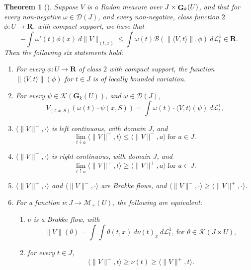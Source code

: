 \documentclass{article}
\theoremstyle{plain}
\newtheorem{theorem}{Theorem}[section]
\theoremstyle{definition}
\theoremstyle{plain}
\theoremstyle{remark}
\theoremstyle{remark}
\theoremstyle{plain}
\DeclareMathOperator{\G}{{\bf G}}
\begin{document}
\begin{theorem}[]\label{thm:Space time Brakke flow}
    Suppose $V$ is a Radon measure over $J\times \G_k(U)$, and that for every non-negative $\omega \in \mathscr D(J)$, and every non-negative, class function $2$ $\phi :  U \to \mathbf R$, with compact support, we have that
    \begin{equation}\label{eq:Brakke's distributional inequality}
        - \textstyle \int \omega'(t) \phi(x) \ d \|V\|_{(t,x)} 
        \leq \textstyle \int \omega(t) \mathscr B(\|\langle V,t\rangle \|,\phi) \ d \mathscr L^1_t \in \mathbf R. 
    \end{equation}
    Then the following six statements hold:
    \begin{enumerate}[label=\ref{thm:Space time Brakke flow}.\arabic{enumi}]
        \item \label{Space time Brakke flow:0}
        For every $\phi : U \to \mathbf R$ of class $2$ with compact support, 
        the function $\|\langle V,t\rangle \|(\phi)$ for $t\in J$ is of locally bounded variation.
        \item For every $\psi \in \mathscr{K} (\mathbf{G}_{k} (U))$, and $\omega \in \mathscr D(J)$, 
        \[ V_{(t,x, S)}(\omega(t)\cdot \psi(x, S)) = \textstyle \int \omega(t)\cdot \langle V,t\rangle (\psi) \ d \mathscr L^1_t,\]
        
        \item \label{Space time Brakke flow:1} $\langle \|V\|^-,\cdot \rangle$ is left continuous, with domain $J$, and 
        \[  \lim\limits_{t \downarrow a} \langle \|V\|^{-},t\rangle  \leq \langle \| V\|^{-},a\rangle \ \text{for $a\in J$}.\]
        \item \label{Space time Brakke flow:2}
        $\langle \| V \|^{+},\cdot \rangle$ is right continuous, with domain $J$, and 
        \[  \lim\limits_{t \uparrow a} \langle \|V\|^{+},t\rangle  \geq \langle \| V\|^{+},a\rangle  \ \text{for $a\in J$}.\]
        \item \label{Space time Brakke flow:3}
        $\langle \|V \|^+,\cdot \rangle $ and $\langle \| V \|^-,\cdot \rangle$ are  Brakke flows, and $\langle \|V \|^{-},\cdot \rangle \geq \langle \| V \|^{+},\cdot \rangle$. 
        \item \label{Space time Brakke flow:4} 
        For a function $\nu \colon J \rightarrow \mathscr{M}_{+} (U)$, the following are equivalent:
        \begin{enumerate}
            \item $\nu$ is a Brakke flow, with 
            \[  \textstyle  \|V\|(\theta) = \int \int \theta(t,x) \ d \nu(t)_x \ d \mathscr L^1_t, \ \text{for $\theta \in \mathscr K(J\times U)$},\]
            \item for every $t \in J$, 
            \[  \langle \| V \|^{-} ,t \rangle \geq \nu(t) \geq \langle \| V \|^{+},t\rangle .\]
        \end{enumerate}
    \end{enumerate}
\end{theorem}
\end{document}
